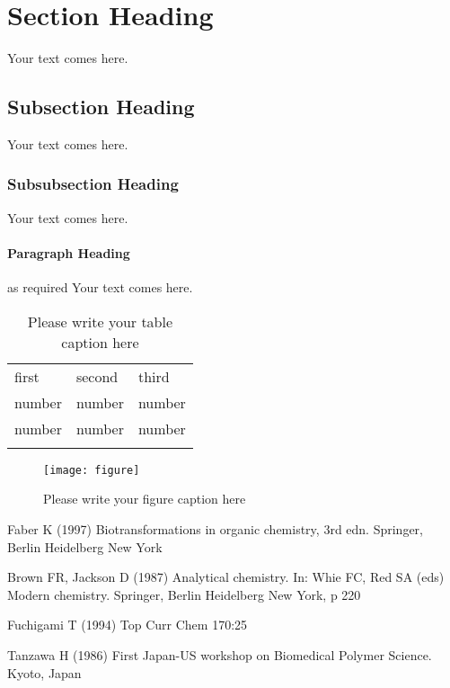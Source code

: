 \documentclass{svcyclop}
\begin{document}
\section{Section Heading}
Your text comes here.

\subsection{Subsection Heading}
Your text comes here.

\subsubsection{Subsubsection Heading}
Your text comes here.

\paragraph{Paragraph Heading} as required
Your text comes here.
%
%
\begin{table}
\caption{Please write your table caption here}
\label{tab:1}       %
\begin{tabular}{lll}
\hline\noalign{\smallskip}
first & second & third  \\
\noalign{\smallskip}\hline\noalign{\smallskip}
number & number & number \\
number & number & number \\
\noalign{\smallskip}\hline
\end{tabular}
\end{table}
%
%
\begin{figure}
\centering
\texttt{[image: figure]}
\caption{Please write your figure caption here}
\label{fig:1}       %
\end{figure}
%
% 
% 
%
\begin{thebibliography}{8.}
%
%
%
 Faber K (1997) Biotransformations in organic
chemistry, 3rd edn. Springer, Berlin Heidelberg New York

 Brown FR, Jackson D (1987) Analytical chemistry.
In: Whie FC, Red SA (eds) Modern chemistry. Springer, Berlin Heidelberg
New York, p 220

Fuchigami T (1994) Top Curr Chem 170:25

 Tanzawa H (1986) First Japan-US workshop on Biomedical
Polymer Science. Kyoto, Japan

\end{thebibliography}

\end{document}
